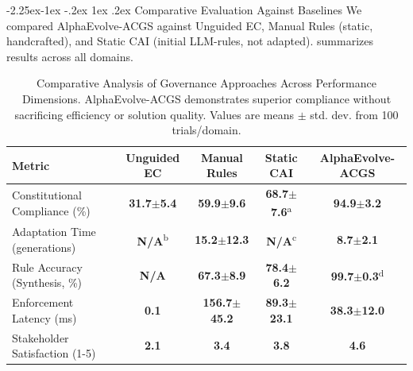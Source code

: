 \documentclass[manuscript,screen,9pt]{acmart}
\makeatletter
\renewcommand\subsection{\@startsection{subsection}{2}{\z@}%
  {-2.25ex\@plus -1ex \@minus -.2ex}%
  {1ex \@plus .2ex}%
  {\normalfont\large\bfseries}}
\newcommand{\tablesize}{\footnotesize}
\newcommand{\tablenumfmt}[1]{\textbf{#1}}
\newcommand{\tableheader}[1]{\textbf{#1}}
\makeatother
\begin{document}
\subsection{Comparative Evaluation Against Baselines}
\label{subsec:comparative_evaluation}
We compared AlphaEvolve-ACGS against Unguided EC, Manual Rules (static, handcrafted), and Static CAI (initial LLM-rules, not adapted).  summarizes results across all domains.
\begin{table}[htbp]
\centering
\caption{Comparative Analysis of Governance Approaches Across Performance Dimensions. AlphaEvolve-ACGS demonstrates superior compliance without sacrificing efficiency or solution quality. Values are means $\pm$ std. dev. from 100 trials/domain.}
\label{tab:baseline_comparison}
\tablesize
\begin{tabular}{@{}lcccc@{}}
\toprule
\tableheader{Metric} & \tableheader{Unguided EC} & \tableheader{Manual Rules} & \tableheader{Static CAI} & \tableheader{AlphaEvolve-ACGS} \\
\midrule
Constitutional Compliance (\%) & \tablenumfmt{31.7$\pm$5.4} & \tablenumfmt{59.9$\pm$9.6} & \tablenumfmt{68.7$\pm$7.6}\textsuperscript{a} & \textbf{\tablenumfmt{94.9$\pm$3.2}} \\
Adaptation Time (generations) & \tablenumfmt{N/A}\textsuperscript{b} & \tablenumfmt{15.2$\pm$12.3} & \tablenumfmt{N/A}\textsuperscript{c} & \textbf{\tablenumfmt{8.7$\pm$2.1}} \\
Rule Accuracy (Synthesis, \%) & \tablenumfmt{N/A} & \tablenumfmt{67.3$\pm$8.9} & \tablenumfmt{78.4$\pm$6.2} & \textbf{\tablenumfmt{99.7$\pm$0.3}}\textsuperscript{d} \\
Enforcement Latency (ms) & \tablenumfmt{0.1} & \tablenumfmt{156.7$\pm$45.2} & \tablenumfmt{89.3$\pm$23.1} & \textbf{\tablenumfmt{38.3$\pm$12.0}} \\
Stakeholder Satisfaction (1-5) & \tablenumfmt{2.1} & \tablenumfmt{3.4} & \tablenumfmt{3.8} & \textbf{\tablenumfmt{4.6}} \\
\bottomrule
\end{tabular}

\end{table}
\end{document}
